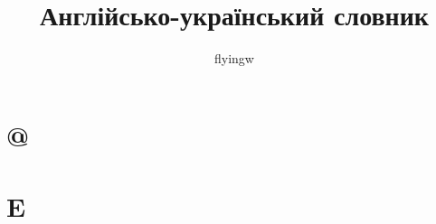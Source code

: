 


\title{Англійсько-український словник}
\author{flyingw}
\maketitle
\thispagestyle{empty}

\newpage

\begin{multicols}{2}

\section{@}


\section{E}


\end{multicols}

\alphabet

